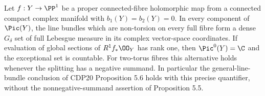 \begin{proposition}\hypertarget{tag-01FW}{}\label{cdp:st:D.1.11}

Let $f:Y\to\PP^1$ be a proper connected-fibre holomorphic map from
a connected compact complex manifold with $b_1(Y)=b_2(Y)=0$.
In every component of $\Pic(Y)$, the line
bundles which are non-torsion on every full fibre form a dense
$G_\delta$ set of full Lebesgue measure in its complex vector-space
coordinates. If evaluation of global sections of $R^1f_*\OO_Y$
has rank one, then $\Pic^0(Y)=\C$ and the exceptional set is
countable. For two-torus fibres this alternative holds whenever
the splitting has a negative summand.
In particular the general-line-bundle conclusion of CDP20
Proposition 5.6 holds with this precise quantifier, without the
nonnegative-summand assertion of Proposition 5.5.
\end{proposition}


